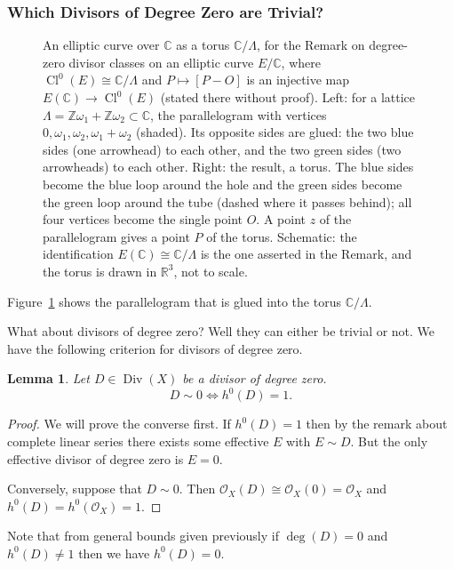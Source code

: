 \documentclass[12pt]{article}
\numberwithin{equation}{section}
\newtheorem{lemma}[theorem]{Lemma}
\theoremstyle{definition}
\theoremstyle{remark}
\newcommand{\RR}{\mathbb{R}}
\newcommand{\CC}{\mathbb{C}}
\newcommand{\ZZ}{\mathbb{Z}}
\newcommand{\Ocal}{\mathcal{O}}
\newcommand{\Div}{\operatorname{Div}}
\newcommand{\Cl}{\operatorname{Cl}}
\begin{document}
\subsubsection{Which Divisors of Degree Zero are Trivial?}
\begin{figure}[H]
\centering

\caption{An elliptic curve over $\CC$ as a torus $\CC/\Lambda$, for the Remark on degree-zero divisor classes on an elliptic curve $E/\CC$, where $\Cl^0(E)\cong\CC/\Lambda$ and $P\mapsto[P-O]$ is an injective map $E(\CC)\to\Cl^0(E)$ (stated there without proof). Left: for a lattice $\Lambda=\ZZ\omega_1+\ZZ\omega_2\subset\CC$, the parallelogram with vertices $0,\omega_1,\omega_2,\omega_1+\omega_2$ (shaded). Its opposite sides are glued: the two blue sides (one arrowhead) to each other, and the two green sides (two arrowheads) to each other. Right: the result, a torus. The blue sides become the blue loop around the hole and the green sides become the green loop around the tube (dashed where it passes behind); all four vertices become the single point $O$. A point $z$ of the parallelogram gives a point $P$ of the torus. Schematic: the identification $E(\CC)\cong\CC/\Lambda$ is the one asserted in the Remark, and the torus is drawn in $\RR^3$, not to scale.}\label{fig:torus-lattice}
\end{figure}
Figure~\ref{fig:torus-lattice} shows the parallelogram that is glued into the torus $\CC/\Lambda$.

What about divisors of degree zero? Well they can either be trivial or not. 
We have the following criterion for divisors of degree zero. 
\begin{lemma}
	Let $D\in \Div(X)$ be a divisor of degree zero. 
	 $$ D \sim 0 \iff h^0(D) = 1.$$
\end{lemma}
\begin{proof}
	We will prove the converse first. 
	If $h^0(D)=1$ then by the remark about complete linear series there exists some effective $E$ with $E\sim D$. 
	But the only effective divisor of degree zero is $E=0$. 
	
	Conversely, suppose that $D\sim 0$. Then $\Ocal_X(D) \cong \Ocal_X(0) = \Ocal_X$ and $h^0(D) =h^0(\Ocal_X)=1$. 
\end{proof}
	Note that from general bounds given previously if $\deg(D)=0$ and $h^0(D)\neq 1$ then we have $h^0(D)=0$.
	
\end{document}
